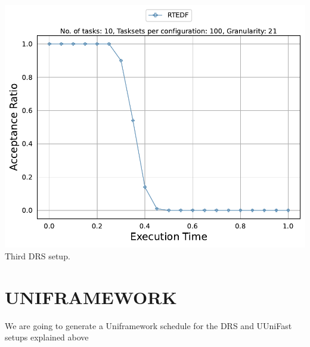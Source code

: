 \documentclass[]{article}
\begin{document}
\begin{minipage}[t]{0.48\linewidth}
		\includegraphics[width=\linewidth]{RTEDF_3rdSetup_DRS.pdf}
		Third DRS setup.
		\vspace{0.3cm}
	\end{minipage}


	\clearpage
	\section{UNIFRAMEWORK}
{
\raggedleft We are going to generate a Uniframework schedule for the DRS and UUniFast setups explained above \newline
}
\end{document}
